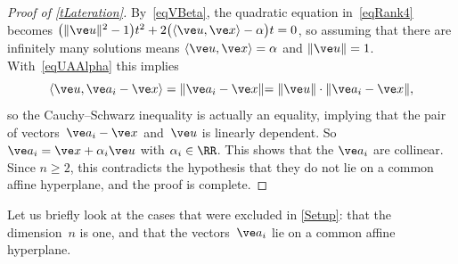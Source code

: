 \documentclass[reqno]{amsart}
\begin{document}
\begin{proof}[Proof of \cref{tLateration}]
  By~\eqref{eqVBeta}, the quadratic equation in~\eqref{eqRank4}
  becomes
  $\bigl(\lVert\ve u\rVert^2-1\bigr) t^2 + 2 \bigl(\langle\ve u,\ve
  x\rangle - \alpha\bigr) t = 0$, so assuming that there are
  infinitely many solutions means $\langle\ve u,\ve x\rangle = \alpha$
  and $\lVert\ve u\rVert = 1$. With~\eqref{eqUAAlpha} this implies
  \[
    \langle\ve u,\ve a_i - \ve x\rangle = \lVert\ve a_i - \ve x\lVert
    = \lVert\ve u\rVert \cdot \lVert\ve a_i - \ve x\lVert,
  \]
  so the Cauchy–Schwarz inequality is actually an equality, implying
  that the pair of vectors~$\ve a_i - \ve x$ and~$\ve u$ is linearly
  dependent. So $\ve a_i = \ve x + \alpha_i \ve u$ with
  $\alpha_i \in \RR$. This shows that the $\ve a_i$ are
  collinear. Since $n \ge 2$, this contradicts the hypothesis that
  they do not lie on a common affine hyperplane, and the proof is
  complete.
\end{proof}

Let us briefly look at the cases that were excluded in \cref{Setup}:
that the dimension~$n$ is one, and that the vectors~$\ve a_i$ lie on a
common affine hyperplane.
\end{document}
